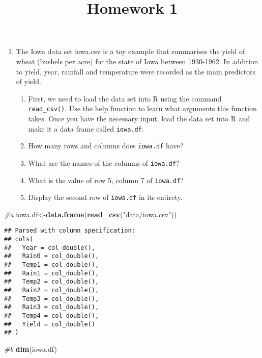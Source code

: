 \documentclass[
]{article}
\title{Homework 1}
\author{}
\date{\vspace{-2.5em}}
\newenvironment{Shaded}{\begin{snugshade}}{\end{snugshade}}
\newcommand{\CommentTok}[1]{\textcolor[rgb]{0.56,0.35,0.01}{\textit{#1}}}
\newcommand{\KeywordTok}[1]{\textcolor[rgb]{0.13,0.29,0.53}{\textbf{#1}}}
\newcommand{\NormalTok}[1]{#1}
\newcommand{\StringTok}[1]{\textcolor[rgb]{0.31,0.60,0.02}{#1}}
\providecommand{\tightlist}{%
  \setlength{\itemsep}{0pt}\setlength{\parskip}{0pt}}
\begin{document}
\maketitle

\begin{enumerate}
\def\labelenumi{\arabic{enumi}.}
\tightlist
\item
  The Iowa data set iowa.csv is a toy example that summarises the yield
  of wheat (bushels per acre) for the state of Iowa between 1930-1962.
  In addition to yield, year, rainfall and temperature were recorded as
  the main predictors of yield.

  \begin{enumerate}
  \def\labelenumii{\alph{enumii}.}
  \tightlist
  \item
    First, we need to load the data set into R using the command
    \texttt{read\_csv()}. Use the help function to learn what arguments
    this function takes. Once you have the necessary input, load the
    data set into R and make it a data frame called \texttt{iowa.df}.
  \item
    How many rows and columns does \texttt{iowa.df} have?
  \item
    What are the names of the columns of \texttt{iowa.df}?
  \item
    What is the value of row 5, column 7 of \texttt{iowa.df}?
  \item
    Display the second row of \texttt{iowa.df} in its entirety.
  \end{enumerate}
\end{enumerate}

\begin{Shaded}
\begin{Highlighting}[]
\CommentTok{#a}
\NormalTok{iowa.df<-}\KeywordTok{data.frame}\NormalTok{(}\KeywordTok{read_csv}\NormalTok{(}\StringTok{"data/iowa.csv"}\NormalTok{))}
\end{Highlighting}
\end{Shaded}

\begin{verbatim}
## Parsed with column specification:
## cols(
##   Year = col_double(),
##   Rain0 = col_double(),
##   Temp1 = col_double(),
##   Rain1 = col_double(),
##   Temp2 = col_double(),
##   Rain2 = col_double(),
##   Temp3 = col_double(),
##   Rain3 = col_double(),
##   Temp4 = col_double(),
##   Yield = col_double()
## )
\end{verbatim}

\begin{Shaded}
\begin{Highlighting}[]
\CommentTok{#b}
\KeywordTok{dim}\NormalTok{(iowa.df)}
\end{Highlighting}
\end{Shaded}
\end{document}
